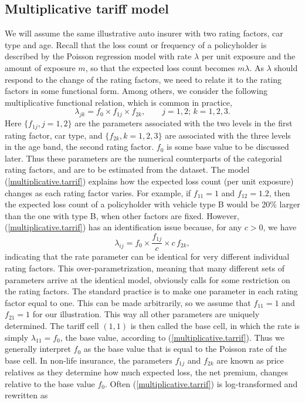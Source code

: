 \documentclass[12pt]{article}
\begin{document}
\subsection{Multiplicative tariff model}
We will assume the same illustrative auto insurer with two rating factors, car type and age. Recall that the loss count or frequency of a policyholder is described by the Poisson regression model with rate $\lambda$ per unit exposure and the amount of exposure $m$, so that the expected loss count becomes $m\lambda$. As $\lambda$ should respond to the change of the rating factors, 
we need to relate it to the rating factors in some functional form. Among others, we consider the following multiplicative functional relation, which is common in practice, 
\begin{equation}
\label{multiplicative.tarrif}
\lambda_{jk}= f_0 \times f_{1j} \times f_{2k}, \qquad j=1,2;\, k=1, 2,3.
\end{equation} 
Here $\{ f_{1j}, j=1,2\}$ are the parameters associated with the two levels in the first rating factor, car type, and  $\{ f_{2k}, k=1,2,3\}$ are associated with the three levels in the age band, the second rating factor. $f_0$ is some base value to be discussed later. Thus these parameters are the numerical counterparts of the categorial rating factors, and are to be estimated from the dataset.  The  model (\ref{multiplicative.tarrif}) explains how the expected loss count (per unit exposure) changes as each rating factor varies. For example, if $f_{11}=1$ and $f_{12}=1.2$, then the expected loss count of a policyholder with vehicle type B would be 20\% larger than the one with type B, when other factors are fixed. However, (\ref{multiplicative.tarrif}) has an identification issue because, for any $c>0$, we have 
\begin{equation}
\label{multi.tariff.2}
\lambda_{ij}= f_0 \times \frac{f_{1j}}{c} \times c\,f_{2k}, 
\end{equation} indicating that the rate parameter can be identical for very different individual rating factors. This over-parametrization, meaning that many different sets of parameters arrive at the identical model, obviously calls for some restriction on the rating factors. The standard practice is to make one parameter in each rating factor equal to one. This can be made arbitrarily, so we assume that $f_{11}=1$ and $f_{21}=1$ for our illustration. This way all other parameters are uniquely determined. The tariff cell $(1,1)$ is then called the base cell, in which the rate is simply $\lambda_{11}=f_0$, the base value, according to (\ref{multiplicative.tarrif}). Thus we generally interpret $f_0$ as the base value that is equal to the Poisson rate of the base cell. In non-life insurance, the parameters $f_{1j}$ and $f_{2k}$  are known as price relatives as they determine how much expected loss, the net premium, changes relative to the base value $f_0$. Often (\ref{multiplicative.tarrif}) is log-transformed and rewritten as
\end{document}
